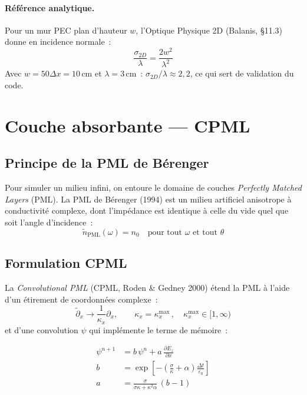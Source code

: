 \documentclass[12pt,a4paper]{article}
\newcommand{\eps}{\varepsilon}
\newcommand{\dx}{\Delta x}
\newcommand{\dt}{\Delta t}
\numberwithin{equation}{section}
\numberwithin{figure}{section}
\numberwithin{table}{section}
\begin{document}
\paragraph{Référence analytique.}
Pour un mur PEC plan d'hauteur $w$, l'Optique Physique 2D (Balanis, §11.3)
donne en incidence normale~:
\begin{equation}
    \frac{\sigma_{2D}}{\lambda} = \frac{2w^2}{\lambda^2}
    \label{eq:SER_PO}
\end{equation}
Avec $w = 50\dx = 10\,\text{cm}$ et $\lambda = 3\,\text{cm}$~:
$\sigma_{2D}/\lambda \approx 2{,}2$, ce qui sert de validation du code.

\section{Couche absorbante --- CPML}

\subsection{Principe de la PML de Bérenger}

Pour simuler un milieu infini, on entoure le domaine de couches
\emph{Perfectly Matched Layers} (PML). La PML de Bérenger (1994) est
un milieu artificiel anisotrope à conductivité complexe, dont l'impédance
est identique à celle du vide quel que soit l'angle d'incidence~:
\begin{equation}
    \tilde{n}_{\text{PML}}(\omega) = n_0
    \quad \text{pour tout } \omega \text{ et tout } \theta
\end{equation}

\subsection{Formulation CPML}

La \emph{Convolutional PML} (CPML, Roden \& Gedney 2000) étend la PML à
l'aide d'un étirement de coordonnées complexe~:
\begin{equation}
    \tilde{\partial}_x \to \frac{1}{\kappa_x} \partial_x,
    \qquad \kappa_x = \kappa_x^{\max}\,, \quad \kappa_x^{\max} \in [1,\infty)
\end{equation}
et d'une convolution $\psi$ qui implémente le terme de mémoire~:

\begin{align}
    \psi^{n+1} &= b\,\psi^n + a\,\frac{\partial E_z}{\partial x}
    \label{eq:psi_update} \\
    b &= \exp\!\left[-\!\left(\frac{\sigma}{\kappa}+\alpha\right)\frac{\dt}{\eps_0}\right] \\
    a &= \frac{\sigma}{\sigma\kappa + \kappa^2\alpha}\,(b-1)
\end{align}
\end{document}
